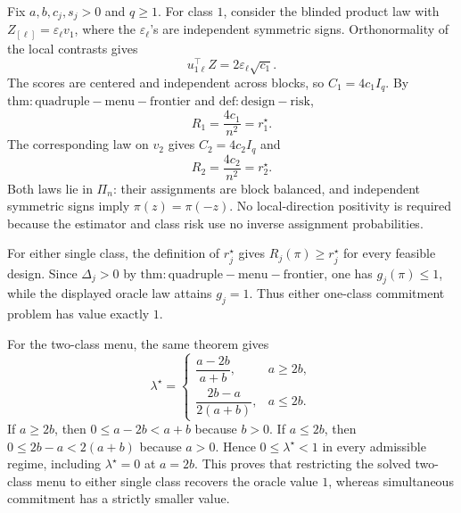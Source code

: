 Fix \(a,b,c_j,s_j>0\) and \(q\ge 1\). For class \(1\), consider the blinded product law with \(Z_{[\ell]}=\varepsilon_\ell v_1\), where the \(\varepsilon_\ell\)'s are independent symmetric signs. Orthonormality of the local contrasts gives
\[
u_{1\ell}^\top Z=2\varepsilon_\ell\sqrt{c_1}.
\]
The scores are centered and independent across blocks, so \(C_1=4c_1I_q\). By \(\mathrm{thm:quadruple-menu-frontier}\) and \(\mathrm{def:design-risk}\),
\[
R_1=\frac{4c_1}{n^2}=r_1^\star.
\]
The corresponding law on \(v_2\) gives \(C_2=4c_2I_q\) and
\[
R_2=\frac{4c_2}{n^2}=r_2^\star.
\]
Both laws lie in \(\Pi_n\): their assignments are block balanced, and independent symmetric signs imply \(\pi(z)=\pi(-z)\). No local-direction positivity is required because the estimator and class risk use no inverse assignment probabilities.

For either single class, the definition of \(r_j^\star\) gives \(R_j(\pi)\ge r_j^\star\) for every feasible design. Since \(\Delta_j>0\) by \(\mathrm{thm:quadruple-menu-frontier}\), one has \(g_j(\pi)\le 1\), while the displayed oracle law attains \(g_j=1\). Thus either one-class commitment problem has value exactly \(1\).

For the two-class menu, the same theorem gives
\[
\lambda^\star=
\begin{cases}
\dfrac{a-2b}{a+b},&a\ge 2b,\\[6pt]
\dfrac{2b-a}{2(a+b)},&a\le 2b.
\end{cases}
\]
If \(a\ge 2b\), then \(0\le a-2b<a+b\) because \(b>0\). If \(a\le 2b\), then \(0\le 2b-a<2(a+b)\) because \(a>0\). Hence \(0\le\lambda^\star<1\) in every admissible regime, including \(\lambda^\star=0\) at \(a=2b\). This proves that restricting the solved two-class menu to either single class recovers the oracle value \(1\), whereas simultaneous commitment has a strictly smaller value.